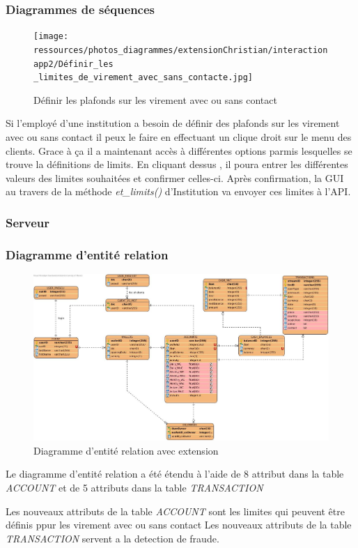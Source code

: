 \documentclass[../rapport.tex]{subfiles}
\begin{document}
\newpage
		\subsubsection{Diagrammes de séquences}
				\begin{figure}[h]
						\centering\texttt{[image: ressources/photos\_diagrammes/extensionChristian/interactionapp2/Définir\_les \_limites\_de\_virement\_avec\_sans\_contacte.jpg]}
						\caption{Définir les plafonds sur les virement avec ou sans contact}
				\end{figure}

				Si l'employé d'une institution a besoin de définir des plafonds sur les virement avec ou sans contact il peux le faire en effectuant un clique droit sur le menu des clients.
                Grace à ça il a maintenant accès à différentes options parmis lesquelles se trouve la définitions de limits. En cliquant dessus , il poura entrer les différentes valeurs
                des limites souhaitées et confirmer celles-ci. Après confirmation, la GUI au travers de la méthode \textit{et\_limits()} d'Institution va envoyer ces limites à l'API.
                
\newpage
		\subsubsection{Serveur}
		\subsubsection{Diagramme d'entité relation}

				\begin{figure}[h]
						\centering\includegraphics[scale=0.25]{ressources/photos_diagrammes/extensionChristian/erd/EntityRelationshipDiagram1.jpg}
						\caption{Diagramme d'entité relation avec extension}
				\end{figure}
		Le diagramme d'entité relation a été étendu à l'aide de 8 attribut dans la table \textit{ACCOUNT} et de 5 attributs dans la table \textit{TRANSACTION}
				
		\medskip

		Les nouveaux attributs de la table \textit{ACCOUNT} sont les limites qui peuvent être définis ppur les virement avec ou sans contact 
        Les nouveaux attributs de la table \textit{TRANSACTION} servent a la detection de fraude.

		
\end{document}

